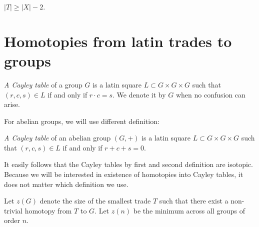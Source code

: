 \begin{cor}
\label{cor:size-of-t}
$|T| \geq |X|-2$.
\end{cor}

\section{Homotopies from latin trades to groups}

\begin{defn}
\emph{A Cayley table} of a group $G$ is a latin square $L \subset G \times G \times G$ such that $(r,c,s) \in L$ if and only if $r \cdot c = s$. We denote it by $G$ when no confusion can arise.
\end{defn}

For abelian groups, we will use different definition:

\begin{defn}
\emph{A Cayley table} of an abelian group $(G,+)$ is a latin square $L \subset G \times G \times G$ such that $(r,c,s) \in L$ if and only if $r + c + s = 0$.
\end{defn}

It easily follows that the Cayley tables by first and second definition are isotopic. Because we will be interested in existence of homotopies into Cayley tables, it does not matter which definition we use.

\begin{defn}
Let $z(G)$ denote the size of the smallest trade $T$ such that there exist a non-trivial homotopy from $T$ to $G$. Let \emph{$z(n)$} be the minimum across all groups of order $n$.
\end{defn}

